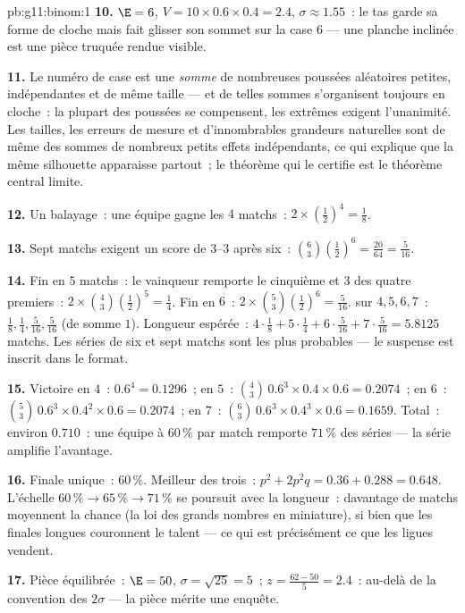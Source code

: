 \begin{solution}{pb:g11:binom:1}
\textbf{10.} $\E = 6$, $V = 10 \times 0.6 \times 0.4 = 2.4$,
$\sigma \approx 1.55$~: le tas garde sa forme de cloche mais fait
glisser son sommet sur la case $6$ --- une planche inclinée est une
pièce truquée rendue visible.

\textbf{11.} Le numéro de case est une \emph{somme} de nombreuses
poussées aléatoires petites, indépendantes et de même taille --- et
de telles sommes s'organisent toujours en cloche~: la plupart des
poussées se compensent, les extrêmes exigent l'unanimité. Les
tailles, les erreurs de mesure et d'innombrables grandeurs
naturelles sont de même des sommes de nombreux petits effets
indépendants, ce qui explique que la même silhouette apparaisse
partout~; le théorème qui le certifie est le théorème central
limite.

\textbf{12.} Un balayage~: une équipe gagne les $4$ matchs~:
$2 \times \left(\frac12\right)^4 = \frac18$.

\textbf{13.} Sept matchs exigent un score de $3$--$3$ après six~:
$\binom63 \left(\frac12\right)^6 = \frac{20}{64} = \frac{5}{16}$.

\textbf{14.} Fin en $5$ matchs~: le vainqueur remporte le
cinquième et $3$ des quatre premiers~:
$2 \times \binom43 \left(\frac12\right)^5 = \frac14$. Fin en $6$~:
$2 \times \binom53 \left(\frac12\right)^6 = \frac{5}{16}$.  sur
$4, 5, 6, 7$~: $\frac18, \frac14, \frac{5}{16}, \frac{5}{16}$
(de somme $1$). Longueur espérée~:
$4 \cdot \frac18 + 5 \cdot \frac14 + 6 \cdot \frac{5}{16} +
7 \cdot \frac{5}{16} = 5.8125$ matchs. Les séries de six et sept
matchs sont les plus probables --- le suspense est inscrit dans le
format.

\textbf{15.} Victoire en $4$~: $0.6^4 = 0.1296$~; en $5$~:
$\binom43\,0.6^3 \times 0.4 \times 0.6 = 0.2074$~; en $6$~:
$\binom53\,0.6^3 \times 0.4^2 \times 0.6 = 0.2074$~; en $7$~:
$\binom63\,0.6^3 \times 0.4^3 \times 0.6 = 0.1659$. Total~: environ
$0.710$~: une équipe à $60\,\%$ par match remporte $71\,\%$ des
séries --- la série amplifie l'avantage.

\textbf{16.} Finale unique~: $60\,\%$. Meilleur des trois~:
$p^2 + 2p^2 q = 0.36 + 0.288 = 0.648$. L'échelle
$60\,\% \to 65\,\% \to 71\,\%$ se poursuit avec la longueur~:
davantage de matchs moyennent la chance (la loi des grands nombres
en miniature), si bien que les finales longues couronnent le talent
--- ce qui est précisément ce que les ligues vendent.

\textbf{17.} Pièce équilibrée~: $\E = 50$, $\sigma = \sqrt{25} =
5$~; $z = \frac{62 - 50}{5} = 2.4$~: au-delà de la convention des
$2\sigma$ --- la pièce mérite une enquête.


\end{solution}
